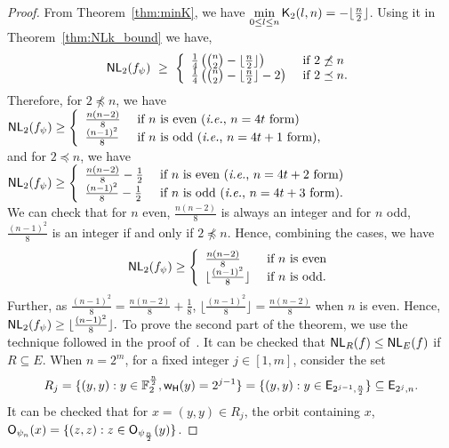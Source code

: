\documentclass{llncs}
\begin{document}
\begin{proof}
From Theorem~\ref{thm:minK}, we have 
$\min\limits_{0 \leq l \leq n} \mathsf{K}_{2}(l,n) = -\lfloor \frac{n}{2} \rfloor$. 
Using it in Theorem~\ref{thm:NLk_bound} we have,
$$\mathsf{NL}_{2}(f_\psi) ~\geq ~ 
\left\{ \begin{array}{ll}
\frac{1}{4}\left({n \choose 2} - \lfloor \frac{n}{2} \rfloor\right)  & \text{ if }  2 \not\preceq n \\
\frac{1}{4}\left({n \choose 2} -\lfloor \frac{n}{2} \rfloor - 2\right) & \text{ if } 2 \preceq n.
\end{array}   \right.$$
Therefore, for $2 \npreceq n$, we have
$\mathsf{NL}_{2}(f_\psi) \geq \left\{
\begin{array}{ll}
 \frac{n(n-2)}{8} & \text{ if } n \text{ is even (\textit{i.e.}, $n = 4t$ form)}\\
 \frac{(n-1)^2}{8} & \text{ if } n \text{ is odd (\textit{i.e.}, $n = 4t+1$ form)},
\end{array} \right.$\\
and for $2 \preceq n$, we have 
$\mathsf{NL}_{2}(f_\psi) \geq \left\{
\begin{array}{ll}
 \frac{n(n-2)}{8}-\frac{1}{2} & \text{ if } n \text{ is even (\textit{i.e.}, $n = 4t+2$ form)} \\
 \frac{(n-1)^2}{8}-\frac{1}{2} & \text{ if } n \text{ is odd (\textit{i.e.}, $n = 4t+3$ form)}.
\end{array} \right.$\\
We can check that for $n$ even, $\frac{n(n-2)}{8}$ is always an integer and for $n$ odd, $\frac{(n-1)^2}{8}$ is an integer if and only if $2 \npreceq n$. Hence, combining the cases, we have 
$$\mathsf{NL}_{2}(f_\psi) \geq \left\{
\begin{array}{ll}
 \frac{n(n-2)}{8} & \text{ if } n \text{ is even} \\
 \lfloor\frac{(n-1)^2}{8}\rfloor & \text{ if } n \text{ is odd}.
\end{array} \right.$$
Further, as $\frac{(n-1)^2}{8} = \frac{n(n-2)}{8} +\frac{1}{8}$, $\lfloor\frac{(n-1)^2}{8}\rfloor = \frac{n(n-2)}{8}$ when $n$ is even. Hence,
$\mathsf{NL}_{2}(f_\psi) \geq \lfloor\frac{(n-1)^2}{8}\rfloor.$
\iffalse
To prove the second part of the theorem, we use the technique followed in the proof of~\cite[Theorem-3.14]{DCC:LiuMes19}.
It can be checked that $\mathsf{NL}_{R}(f) \leq \mathsf{NL}_{E}(f)$ if $R \subseteq E$.
When $n = 2^m$, for a fixed integer $j \in [1,m]$, consider the set  
$$R_j = \{(y,y) : y \in \mathbb{F}_2^{\frac{n}{2}}, \mathsf{w_H}(y)= 2^{j-1} \} = \{(y,y) : y \in \mathsf{E}_{2^{j-1},\frac{n}{2}} \} \subseteq \mathsf{E}_{2^j,n}.$$
It can be checked that for $x = (y,y) \in R_j$, the orbit containing $x$, $\mathsf{O}_{\psi_n}(x) = \{(z,z) : z \in \mathsf{O}_{\psi_\frac{n}{2}}(y)\}$.

\end{proof}
\end{document}

